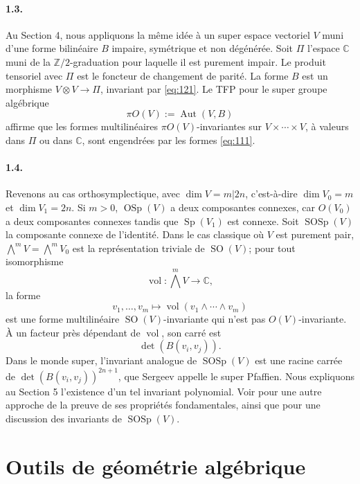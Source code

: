 \documentclass[11pt]{article}
\newcommand{\C}{\mathbb C}
\newcommand{\Z}{\mathbb Z}
\newcommand{\Aut}{\operatorname{Aut}}
\newcommand{\OSp}{\operatorname{OSp}}
\newcommand{\SOSp}{\operatorname{SOSp}}
\newcommand{\SO}{\operatorname{SO}}
\newcommand{\Sp}{\operatorname{Sp}}
\begin{document}
\paragraph{1.3.}
Au Section 4, nous appliquons la même idée à un super espace vectoriel $V$ muni d'une forme bilinéaire $B$ impaire, symétrique et non dégénérée. Soit $\Pi$ l'espace $\C$ muni de la $\Z/2$-graduation pour laquelle il est purement impair. Le produit tensoriel avec $\Pi$ est le foncteur de changement de parité. La forme $B$ est un morphisme $V\otimes V\to\Pi$, invariant par \eqref{eq:121}. Le TFP pour le super groupe algébrique
\[
\pi O(V):=\Aut(V,B)
\]
affirme que les formes multilinéaires $\pi O(V)$-invariantes sur $V\times\cdots\times V$, à valeurs dans $\Pi$ ou dans $\C$, sont engendrées par les formes \eqref{eq:111}.

\paragraph{1.4.}
Revenons au cas orthosymplectique, avec $\dim V=m|2n$, c'est-à-dire $\dim V_0=m$ et $\dim V_1=2n$. Si $m>0$, $\OSp(V)$ a deux composantes connexes, car $O(V_0)$ a deux composantes connexes tandis que $\Sp(V_1)$ est connexe. Soit $\SOSp(V)$ la composante connexe de l'identité. Dans le cas classique où $V$ est purement pair, $\bigwedge^mV=\bigwedge^mV_0$ est la représentation triviale de $\SO(V)$; pour tout isomorphisme
\[
\operatorname{vol}:\bigwedge^m V\longrightarrow \C,
\]
la forme
\[
v_1,\ldots,v_m\longmapsto \operatorname{vol}(v_1\wedge\cdots\wedge v_m)
\]
est une forme multilinéaire $\SO(V)$-invariante qui n'est pas $O(V)$-invariante. À un facteur près dépendant de $\operatorname{vol}$, son carré est
\[
\det(B(v_i,v_j)).
\]
Dans le monde super, l'invariant analogue de $\SOSp(V)$ est une racine carrée de $\det(B(v_i,v_j))^{2n+1}$, que Sergeev appelle le super Pfaffien. Nous expliquons au Section 5 l'existence d'un tel invariant polynomial. Voir \cite{LZ15} pour une autre approche de la preuve de ses propriétés fondamentales, ainsi que pour une discussion des invariants de $\SOSp(V)$.

\section{Outils de géométrie algébrique}
\end{document}
